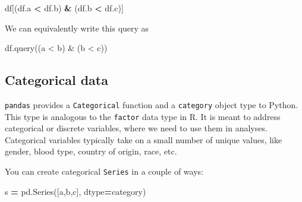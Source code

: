 \documentclass[
  letterpaper,
]{scrbook}
\newenvironment{Shaded}{\begin{snugshade}}{\end{snugshade}}
\newcommand{\NormalTok}[1]{#1}
\newcommand{\OperatorTok}[1]{\textcolor[rgb]{0.81,0.36,0.00}{\textbf{#1}}}
\newcommand{\StringTok}[1]{\textcolor[rgb]{0.31,0.60,0.02}{#1}}
\begin{document}
\begin{Shaded}
\begin{Highlighting}[]
\NormalTok{df[(df.a }\OperatorTok{\textless{}}\NormalTok{ df.b) }\OperatorTok{\&}\NormalTok{ (df.b }\OperatorTok{\textless{}}\NormalTok{ df.c)]}
\end{Highlighting}
\end{Shaded}

We can equivalently write this query as

\begin{Shaded}
\begin{Highlighting}[]
\NormalTok{df.query(}\StringTok{\textquotesingle{}(a \textless{} b) \& (b \textless{} c)\textquotesingle{}}\NormalTok{)}
\end{Highlighting}
\end{Shaded}

\hypertarget{categorical-data}{%
\subsection{Categorical data}\label{categorical-data}}

\texttt{pandas} provides a \texttt{Categorical} function and a \texttt{category} object type to Python. This type is analogous to the \texttt{factor} data type in R. It is meant to address categorical or discrete variables, where we need to use them in analyses. Categorical variables typically take on a small number of unique values, like gender, blood type, country of origin, race, etc.

You can create categorical \texttt{Series} in a couple of ways:

\begin{Shaded}
\begin{Highlighting}[]
\NormalTok{s }\OperatorTok{=}\NormalTok{ pd.Series([}\StringTok{\textquotesingle{}a\textquotesingle{}}\NormalTok{,}\StringTok{\textquotesingle{}b\textquotesingle{}}\NormalTok{,}\StringTok{\textquotesingle{}c\textquotesingle{}}\NormalTok{], dtype}\OperatorTok{=}\StringTok{\textquotesingle{}category\textquotesingle{}}\NormalTok{)}
\end{Highlighting}
\end{Shaded}
\end{document}
